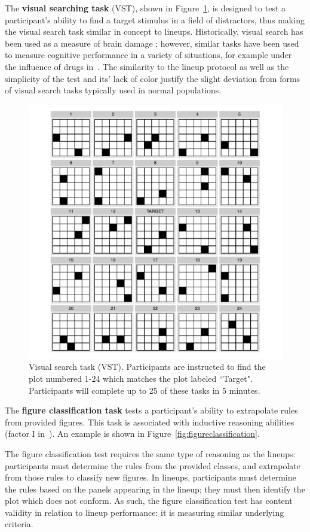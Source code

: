 \documentclass[11pt]{isuthesis}\usepackage[]{graphicx}\usepackage[]{color}
\begin{document}
The \textbf{visual searching task} (VST), shown in Figure~\ref{fig:VST}, is designed to test a participant's ability to find a target stimulus in a field of distractors, thus making the visual search task similar in concept to lineups. Historically, visual search has been used as a measure of brain damage \citep{goldstein1973validity,demita1981validity,moerland1986neuropsychological}; however, similar tasks have been used to measure cognitive performance in a variety of situations, for example under the influence of drugs in~\citep{anderson1983interactive}. The similarity to the lineup protocol as well as the simplicity of the test and its' lack of color justify the slight deviation from forms of visual search tasks typically used in normal populations. 
\begin{figure}[htp]\centering
\includegraphics[width=.6\linewidth]{VisualSearch}
\caption[Visual search task]{Visual search task (VST). Participants are instructed to find the plot numbered 1-24 which matches the plot labeled ``Target". Participants will complete up to 25 of these tasks in 5 minutes.}\label{fig:VST}
\end{figure}


The \textbf{figure classification task} tests a participant's ability to extrapolate rules from provided figures. This task is associated with inductive reasoning abilities (factor I  in~\citet{ekstrom1976manual}). An example is shown in Figure~\ref{fig:figureclassification}. 

The figure classification test requires the same type of reasoning as the lineups: participants must determine the rules from the provided classes, and extrapolate from those rules to classify new figures. In lineups, participants must determine the rules based on the panels appearing in the lineup; they must then identify the plot which does not conform. As such, the figure classification test has content validity in relation to lineup performance: it is measuring similar underlying criteria. 
\end{document}

